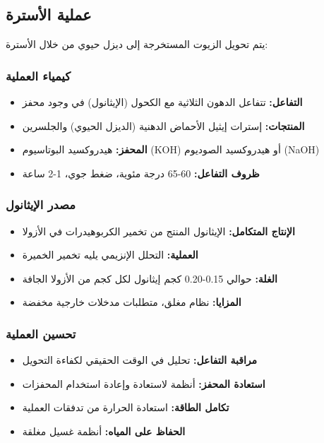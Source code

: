 \subsection{عملية الأسترة}

يتم تحويل الزيوت المستخرجة إلى ديزل حيوي من خلال الأسترة:

\subsubsection{كيمياء العملية}
\begin{itemize}
    \item \textbf{التفاعل:} تتفاعل الدهون الثلاثية مع الكحول (الإيثانول) في وجود محفز
    \item \textbf{المنتجات:} إسترات إيثيل الأحماض الدهنية (الديزل الحيوي) والجلسرين
    \item \textbf{المحفز:} هيدروكسيد البوتاسيوم (KOH) أو هيدروكسيد الصوديوم (NaOH)
    \item \textbf{ظروف التفاعل:} 60-65 درجة مئوية، ضغط جوي، 1-2 ساعة
\end{itemize}

\subsubsection{مصدر الإيثانول}
\begin{itemize}
    \item \textbf{الإنتاج المتكامل:} الإيثانول المنتج من تخمير الكربوهيدرات في الأزولا
    \item \textbf{العملية:} التحلل الإنزيمي يليه تخمير الخميرة
    \item \textbf{الغلة:} حوالي 0.15-0.20 كجم إيثانول لكل كجم من الأزولا الجافة
    \item \textbf{المزايا:} نظام مغلق، متطلبات مدخلات خارجية مخفضة
\end{itemize}

\subsubsection{تحسين العملية}
\begin{itemize}
    \item \textbf{مراقبة التفاعل:} تحليل في الوقت الحقيقي لكفاءة التحويل
    \item \textbf{استعادة المحفز:} أنظمة لاستعادة وإعادة استخدام المحفزات
    \item \textbf{تكامل الطاقة:} استعادة الحرارة من تدفقات العملية
    \item \textbf{الحفاظ على المياه:} أنظمة غسيل مغلقة
\end{itemize}


